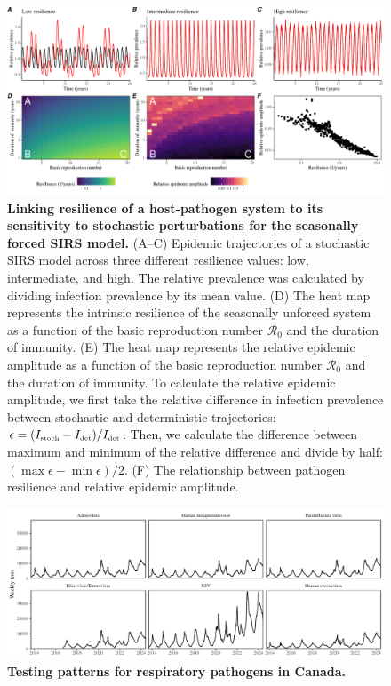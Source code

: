 \documentclass[12pt]{article}
\newcommand{\tsub}[2]{#1_{{\textrm{\tiny #2}}}}
\begin{document}
\begin{figure}[!th]
\begin{center}
\includegraphics[width=\textwidth]{../figure6/figure_persistence_noise_cycle.pdf}
\caption{
\textbf{Linking resilience of a host-pathogen system to its sensitivity to stochastic perturbations for the seasonally forced SIRS model.}
(A--C) Epidemic trajectories of a stochastic SIRS model across three different resilience values: low, intermediate, and high.
The relative prevalence was calculated by dividing infection prevalence by its mean value.
(D) The heat map represents the intrinsic resilience of the seasonally unforced system as a function of the basic reproduction number $\mathcal R_0$ and the duration of immunity.
(E) The heat map represents the relative epidemic amplitude as a function of the basic reproduction number $\mathcal R_0$ and the duration of immunity.
To calculate the relative epidemic amplitude, we first take the relative difference in infection prevalence between stochastic and deterministic trajectories: $\epsilon = (\tsub{I}{stoch}-\tsub{I}{det})/\tsub{I}{det}$. 
Then, we calculate the difference between maximum and minimum of the relative difference and divide by half: $(\max \epsilon - \min \epsilon)/2$.
(F) The relationship between pathogen resilience and relative epidemic amplitude.
}
\end{center}
\end{figure}

\pagebreak

\begin{figure}[!th]
\begin{center}
\includegraphics[width=\textwidth]{../figure_test/figure_test_canada.pdf}
\caption{
\textbf{Testing patterns for respiratory pathogens in Canada.}
}
\end{center}
\end{figure}
\end{document}
